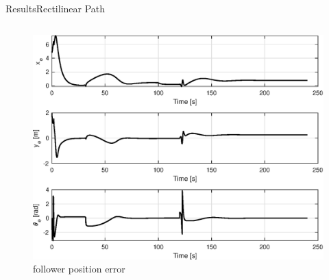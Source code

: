 \documentclass{beamer}
\begin{document}
\begin{frame}{Results}{Rectilinear Path}
\begin{columns}
\begin{column}{0.5\textwidth}
\begin{center}
\begin{figure}
\includegraphics[scale=0.35]{figs/matlab/gradientDescent/rectlinear/stateErrorRectilinear.eps}
\caption{follower position error}
\end{figure}
\end{center}

\end{column}

\end{columns}
\end{frame}
\end{document}
